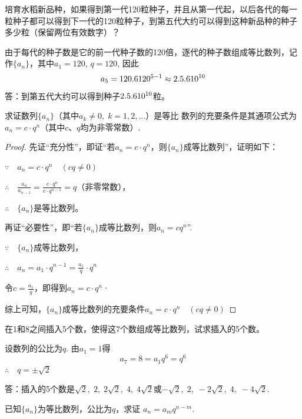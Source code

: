 \begin{example}
    培育水稻新品种，如果得到第一代120粒种子，并且从第一代起，以后各代的每一粒种子都可以得到下一代的120粒种子，到第五代大约可以得到这种新品种的种子多少粒（保留两位有效数字）？
\end{example}

\begin{solution}
由于每代的种子数是它的前一代种子数的120倍，逐代的种子数组成等比数列，记作$\{a_n\}$，其中$a_1=120$, $q=120$, 因此
\[a_5=120.6120^{5-1}\approx 2.5.610^{10}\]
答：到第五代大约可以得到种子$2.5.610^{10}$粒。
\end{solution}

    
\begin{example}
    求证数列$\{a_n\}$（其中$a_k\ne 0,\; k=1,2,\ldots$）是等比
数列的充要条件是其通项公式为$a_n=c\cdot q^n$（其中$c$、$q$均为非零常数）.
\end{example}

\begin{proof}
先证“充分性”，即证“若$a_n=c\cdot q^n$，则$\{a_n\}$成等比数列”，证明如下：

$\because\quad a_n=c\cdot q^n\quad (cq\ne 0)$

$\therefore\quad \frac{a_n}{a_{n-1}}=\frac{c\cdot q^n}{c\cdot q^{n-1}}=q$（非零常数），

$\therefore\quad \{a_n\}$是等比数列。

再证“必要性”，即“若$\{a_n\}$成等比数列，则$a_n=cq^n$”.

$\because\quad\{a_n\}$成等比数列，

$\therefore\quad a_n=a_1\cdot q^{n-1}=\frac{a_1}{q}\cdot q^n$

令$c=\frac{a_1}{q}$，即得到$a_n=c\cdot q^n$·

综上可知，$\{a_n\}$成等比数列的充要条件$a_n=c\cdot q^n\quad (cq\ne 0)$
\end{proof}

\begin{example}
    在1和8之间插入5个数，使得这7个数组成等比数列，试求插入的5个数。
\end{example}

\begin{solution}
    设数列的公比为$q$. 由$a_1=1$得
\[a_7=8=a_1 q^6=q^6\]
$\therefore\quad q=\pm\sqrt{2}$

答：插入的5个数是$\sqrt{2},\; 2,\; 2\sqrt{2},\; 4,\; 4\sqrt{2}$或$-\sqrt{2},\; 2,\; -2\sqrt{2},\; 4,\; -4\sqrt{2}$.
\end{solution}

\begin{example}
    已知$\{a_n\}$为等比数列，公比为$q$，求证
$a_n=a_mq^{n-m}$.
\end{example}

